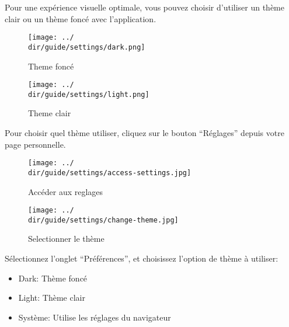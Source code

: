Pour une expérience visuelle optimale, vous pouvez choisir d’utiliser un thème clair ou un thème foncé avec l’application.

\begin{multicols}{2}
\begin{figure}[H]
	\texttt{[image: ../\\dir/guide/settings/dark.png]}
	\caption{Theme foncé}
\end{figure}
\begin{figure}[H]
	\texttt{[image: ../\\dir/guide/settings/light.png]}
	\caption{Theme clair}
\end{figure}
\end{multicols}

Pour choisir quel thème utiliser, cliquez sur le bouton “Réglages” depuis votre page personnelle.

\begin{figure}[H]
	\texttt{[image: ../\\dir/guide/settings/access-settings.jpg]}
	\caption{Accéder aux reglages}
\end{figure}
\begin{figure}[H]
	\texttt{[image: ../\\dir/guide/settings/change-theme.jpg]}
	\caption{Selectionner le thème}
\end{figure}

Sélectionnez l’onglet “Préférences”, et choisissez l’option de thème à utiliser:

\begin{itemize}
 	\item Dark: Thème foncé
 	\item Light: Thème clair
 	\item Système: Utilise les réglages du navigateur
\end{itemize}
